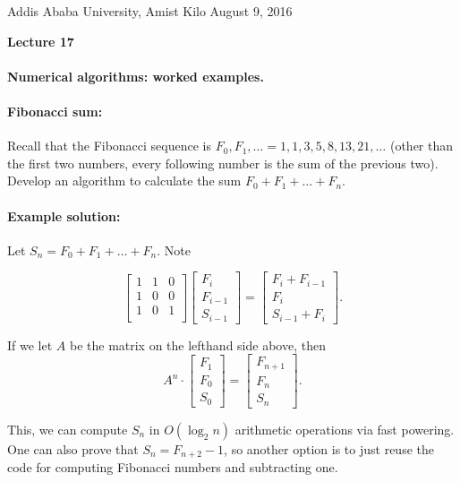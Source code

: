 \documentclass[11pt]{article}
\newlength{\toppush}
\newcommand{\htitle}[2]{\noindent\vspace*{-\toppush}\newline\parbox{6.5in}
 {\large Addis Ababa University, Amist Kilo \hfill #1\newline
\hspace*{\fill}{\bf Algorithms and Programming for High Schoolers} \hspace*{\fill} \newline
\mbox{}\hrulefill\mbox{}}\vspace*{1ex}\mbox{}\newline
\begin{center}{\Large\bf #2}\end{center}}
\begin{document}
\htitle{August 9, 2016}{Lecture 17}

\paragraph{\Large Numerical algorithms: worked examples.}

\paragraph{\Large  Fibonacci sum:}
Recall that the Fibonacci sequence is $F_0,F_1,\ldots =
1,1,3,5,8,13,21,\ldots$ (other than the first two numbers, every
following number is the sum of the previous two).  Develop an
algorithm to calculate the sum $F_0 + F_1 + \ldots + F_n$.

\paragraph{Example solution:}
Let $S_n = F_0 + F_1 + \ldots + F_n$.  Note

$$ \left[
\begin{array}{ccc}
1 & 1 & 0 \\
1 & 0 & 0 \\
1 & 0 & 1 \\
\end{array}\right ] \left[\begin{array}{c}
  F_i\\F_{i-1}\\S_{i-1}\end{array}\right] =
\left[\begin{array}{c} F_i+F_{i-1}\\F_i\\S_{i-1}+F_i\end{array}\right] .$$

If we let $A$ be the matrix on the lefthand side above, then
$$ A^n \cdot \left[\begin{array}{c} F_1\\F_{0}\\S_0\end{array}\right] =
\left[\begin{array}{c} F_{n+1}\\F_n\\S_n\end{array}\right] .$$

This, we can compute $S_n$ in $O(\log_2 n)$ arithmetic operations via
fast powering.  One can also prove that $S_n = F_{n+2} - 1$, so
another option is to just reuse the code for computing 
Fibonacci numbers and subtracting one.
\end{document}
